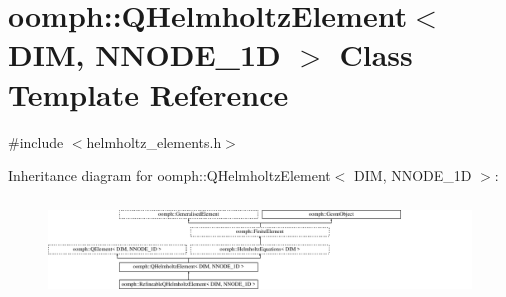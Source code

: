 \hypertarget{classoomph_1_1QHelmholtzElement}{}\section{oomph\+:\+:Q\+Helmholtz\+Element$<$ D\+IM, N\+N\+O\+D\+E\+\_\+1D $>$ Class Template Reference}
\label{classoomph_1_1QHelmholtzElement}


{\ttfamily \#include $<$helmholtz\+\_\+elements.\+h$>$}

Inheritance diagram for oomph\+:\+:Q\+Helmholtz\+Element$<$ D\+IM, N\+N\+O\+D\+E\+\_\+1D $>$\+:\begin{figure}[H]
\begin{center}
\leavevmode
\includegraphics[height=2.629108cm]{classoomph_1_1QHelmholtzElement}
\end{center}
\end{figure}
